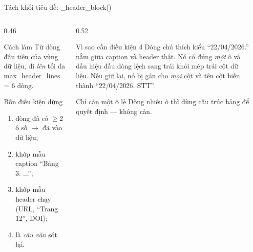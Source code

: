 \documentclass[aspectratio=169,11pt]{beamer}
\newcommand{\src}[1]{{\footnotesize\ttfamily #1}}
\begin{document}
\begin{frame}{Tách khối tiêu đề: \src{\_header\_block()}}
  \begin{columns}[T]
    \begin{column}{0.46\textwidth}
      \begin{block}{\small Cách làm}
        Từ dòng đầu tiên của vùng dữ liệu, đi \emph{lên} tối đa
        \src{max\_header\_lines = 6} dòng.
      \end{block}
      \begin{block}{\small Bốn điều kiện dừng}
        \begin{enumerate}\footnotesize
          \item dòng đã có $\ge 2$ ô số $\rightarrow$ đã vào dữ liệu;
          \item khớp mẫu caption \src{``Bảng 3: ...''};
          \item khớp mẫu header chạy (URL, ``Trang 12'', DOI);
          \item là \emph{câu văn} sót lại.
        \end{enumerate}
      \end{block}
    \end{column}
    \begin{column}{0.52\textwidth}
      \begin{alertblock}{\small Vì sao cần điều kiện 4}
        Dòng chú thích kiểu ``22/04/2026.'' nằm giữa caption và header thật.
        Nó có đúng \emph{một} ô và dấu hiệu đầu dòng lệch sang trái khỏi mép trái
        cột dữ liệu. Nếu giữ lại, nó bị gán cho \emph{mọi} cột và tên cột biến
        thành ``22/04/2026. STT''.
      \end{alertblock}
      \begin{block}{\small Chỉ cản một ô lẻ}
        Dòng nhiều ô thì dùng cấu trúc bảng để quyết định — không cản.
      \end{block}
    \end{column}
  \end{columns}
\end{frame}
\end{document}
